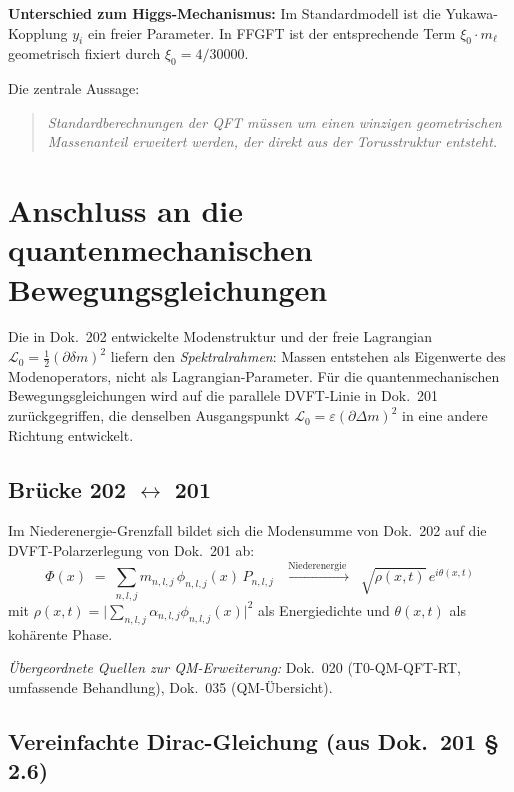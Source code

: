 \textbf{Unterschied zum Higgs-Mechanismus:}
Im Standardmodell ist die Yukawa-Kopplung $y_i$ ein freier Parameter.
In FFGFT ist der entsprechende Term $\xi_0 \cdot m_\ell$ geometrisch
fixiert durch $\xi_0 = 4/30000$.

Die zentrale Aussage:
\begin{quote}
\emph{Standardberechnungen der QFT müssen um einen winzigen geometrischen
Massenanteil erweitert werden, der direkt aus der Torusstruktur entsteht.}
\end{quote}

\section{Anschluss an die quantenmechanischen Bewegungsgleichungen}

Die in Dok.~202 entwickelte Modenstruktur und der freie Lagrangian
$\mathcal{L}_0 = \tfrac12(\partial\delta m)^2$ liefern den
\emph{Spektralrahmen}: Massen entstehen als Eigenwerte des Modenoperators,
nicht als Lagrangian-Parameter. Für die quantenmechanischen
Bewegungsgleichungen wird auf die parallele DVFT-Linie in Dok.~201
zurückgegriffen, die denselben Ausgangspunkt
$\mathcal{L}_0 = \varepsilon(\partial\Delta m)^2$ in eine andere
Richtung entwickelt.

\subsection*{Brücke 202 $\leftrightarrow$ 201}

Im Niederenergie-Grenzfall bildet sich die Modensumme von Dok.~202
auf die DVFT-Polarzerlegung von Dok.~201 ab:
\begin{equation}
  \Phi(x) \;=\; \sum_{n,l,j} m_{n,l,j}\,\phi_{n,l,j}(x)\,P_{n,l,j}
  \;\;\xrightarrow{\;\text{Niederenergie}\;}\;\;
  \sqrt{\rho(x,t)}\,e^{i\theta(x,t)}
  \tag{202.\,QM-1}
\end{equation}
mit
$\rho(x,t) = \big|\sum_{n,l,j} \alpha_{n,l,j}\phi_{n,l,j}(x)\big|^2$ als
Energiedichte und $\theta(x,t)$ als kohärente Phase.

\textit{Übergeordnete Quellen zur QM-Erweiterung:} Dok.~020
(T0-QM-QFT-RT, umfassende Behandlung), Dok.~035 (QM-Übersicht).

\subsection*{Vereinfachte Dirac-Gleichung (aus Dok.~201 \S\,2.6)}

